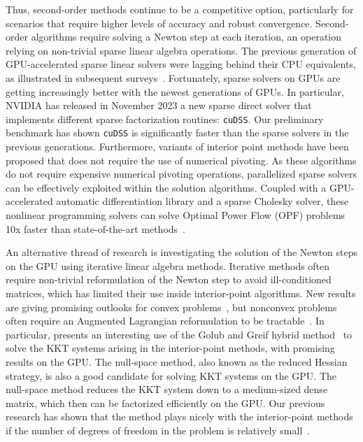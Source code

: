 Thus, second-order methods continue to be a competitive option, particularly
for scenarios that require higher levels of accuracy and robust convergence.
Second-order algorithms require solving a Newton step at each
iteration, an operation relying on non-trivial sparse linear algebra operations.
The previous generation of GPU-accelerated sparse linear
solvers were lagging behind their CPU equivalents, as illustrated in
subsequent surveys~\cite{tasseff2019exploring,swirydowicz2021linear}.
Fortunately, sparse solvers on GPUs are getting increasingly better with the newest
generations of GPUs. In particular, NVIDIA has released in November 2023
a new sparse direct solver that implements different sparse factorization routines: {\tt cuDSS}. Our
preliminary benchmark has shown {\tt cuDSS} is significantly
faster than the sparse solvers in the previous generations.
Furthermore, variants of interior point methods have been proposed
that does not require the use of numerical pivoting.
As these algorithms do not require expensive numerical pivoting
operations, parallelized sparse solvers can be effectively exploited
within the solution algorithms.
Coupled with a GPU-accelerated automatic differentiation library and a
sparse Cholesky solver, these nonlinear programming solvers can solve
Optimal Power Flow (OPF) problems 10x faster than state-of-the-art
methods~\cite{shin2023accelerating}.

An alternative thread of research is investigating the solution of the Newton steps
on the GPU using iterative linear algebra methods.
Iterative methods often require non-trivial reformulation of the Newton step to avoid
ill-conditioned matrices, which has limited their use inside interior-point
algorithms. New results are giving promising outlooks for convex problems~\cite{ghannad2022linear},
but nonconvex problems often require an Augmented Lagrangian reformulation
to be tractable~\cite{cao2016augmented,regev2023hykkt}. In particular,
\cite{regev2023hykkt} presents an interesting use of the Golub and Greif
hybrid method~\cite{golub2003solving} to solve the KKT systems arising in
the interior-point methods, with promising results on the GPU.
The null-space method, also known as the reduced Hessian strategy,
is also a good candidate for solving KKT systems on the GPU.
The null-space method reduces the KKT system down to
a medium-sized dense matrix, which then can be factorized efficiently on the GPU.
Our previous research has shown that the method plays nicely with the interior-point
methods if the number of degrees of freedom in the problem is relatively small~\cite{pacaud2022condensed}.

